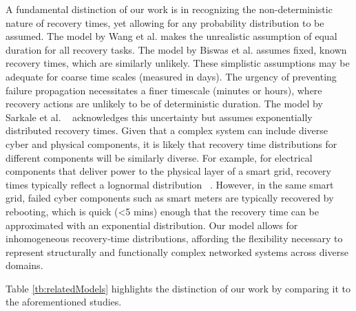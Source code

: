\documentclass[conference]{IEEEtran}
\begin{document}
A fundamental distinction of our work is in recognizing the non-deterministic nature of recovery times, yet allowing for any probability distribution to be assumed. The model by Wang et al. \cite{wang_q-learning-based_2025} makes the unrealistic assumption of equal duration for all recovery tasks. The model by Biswas et al. \cite{biswas_repair_2025} assumes fixed, known recovery times, which are similarly unlikely. These simplistic assumptions may be adequate for coarse time scales (measured in days). The urgency of preventing failure propagation necessitates a finer timescale (minutes or hours), where recovery actions are unlikely to be of deterministic duration. The model by Sarkale et al. ~\cite{sarkale_solving_2018} acknowledges this uncertainty but assumes exponentially distributed recovery times. Given that a complex system can include diverse cyber and physical components, it is likely that recovery time distributions for different components will be similarly diverse. For example, for electrical components that deliver power to the physical layer of a smart grid, recovery times typically reflect a lognormal distribution ~\cite{l_c_cadwallader_review_2012}. However, in the same smart grid, failed cyber components such as smart meters are typically recovered by rebooting, which is quick (<5 mins) enough that the recovery time can be approximated with an exponential distribution. Our model allows for inhomogeneous recovery‑time distributions, affording the flexibility necessary to represent structurally and functionally complex networked systems across diverse domains. 



Table \ref{tb:relatedModels} highlights the distinction of our work by comparing it to the aforementioned studies. 
\end{document}
